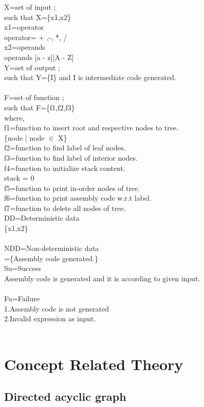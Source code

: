 \documentclass[12pt]{article}
\begin{document}
X=set of input ;\\
such that X=\{x1,x2\}\\
x1=operator\\
operator= + ,-, *, /\\
x2=operands\\
operands [a - z][A - Z]\\
Y=set of output ;\\
such that Y=\{I\} and I is intermediate code generated.\\\\
F=set of function ;\\
such that F=\{f1,f2,f3\}\\
where,\\
f1=function to insert root and respective nodes to tree.\\
\{node | node $\in$ X\}\\
f2=function to find label of leaf nodes.\\
f3=function to find label of interior nodes.\\
f4=function to initialize stack content.\\
{stack = 0}\\
f5=function to print in-order nodes of tree.\\
f6=function to print assembly code w.r.t label.\\
f7=function to delete all nodes of tree.\\

DD=Deterministic data\\
\{x1,x2\}\\\\
NDD=Non-deterministic data\\
=\{Assembly code generated.\}\\
Su=Success\\
Assembly code is generated and it is according to given input.\\\\
Fu=Failure\\
1.Assembly code is not generated\\
2.Invalid expression as input.\\\\

\section{Concept Related Theory}
\subsection{Directed acyclic graph}
\end{document}
